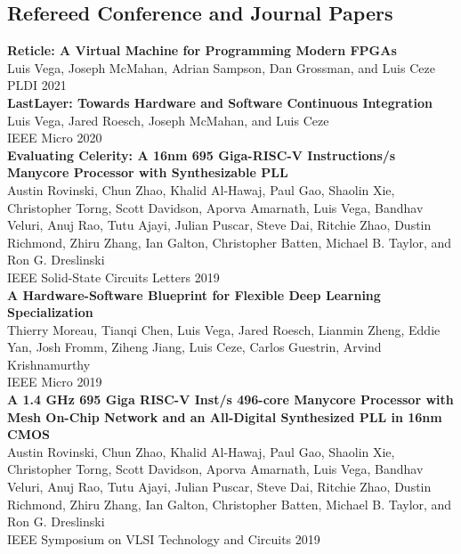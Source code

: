 \documentclass[10pt]{article}
\begin{document}
\subsection*{Refereed Conference and Journal Papers}

\textbf{%
  Reticle: A Virtual Machine for Programming Modern FPGAs
} \\
Luis Vega, Joseph McMahan, Adrian Sampson, Dan Grossman, and Luis Ceze \\
PLDI 2021 \\

\textbf{%
  LastLayer: Towards Hardware and Software Continuous Integration
} \\
Luis Vega, Jared Roesch, Joseph McMahan, and Luis Ceze \\
IEEE Micro 2020 \\

\textbf{%
  Evaluating Celerity: A 16nm 695 Giga-RISC-V Instructions/s Manycore Processor with Synthesizable PLL
} \\
Austin Rovinski, Chun Zhao, Khalid Al-Hawaj, Paul Gao, Shaolin Xie, Christopher Torng,
Scott Davidson, Aporva Amarnath, Luis Vega, Bandhav Veluri, Anuj Rao, Tutu Ajayi,
Julian Puscar, Steve Dai, Ritchie Zhao, Dustin Richmond, Zhiru Zhang, Ian Galton,
Christopher Batten, Michael B. Taylor, and Ron G. Dreslinski \\
IEEE Solid-State Circuits Letters 2019 \\

\textbf{%
  A Hardware-Software Blueprint for Flexible Deep Learning Specialization
} \\
Thierry Moreau, Tianqi Chen, Luis Vega, Jared Roesch, Lianmin Zheng, Eddie Yan,
Josh Fromm, Ziheng Jiang, Luis Ceze, Carlos Guestrin, Arvind Krishnamurthy \\
IEEE Micro 2019 \\
  
\textbf{%
  A 1.4 GHz 695 Giga RISC-V Inst/s 496-core Manycore Processor with Mesh On-Chip Network and an All-Digital Synthesized PLL in 16nm CMOS
} \\
Austin Rovinski, Chun Zhao, Khalid Al-Hawaj, Paul Gao, Shaolin Xie, Christopher Torng,
Scott Davidson, Aporva Amarnath, Luis Vega, Bandhav Veluri, Anuj Rao, Tutu Ajayi,
Julian Puscar, Steve Dai, Ritchie Zhao, Dustin Richmond, Zhiru Zhang, Ian Galton,
Christopher Batten, Michael B. Taylor, and Ron G. Dreslinski \\
IEEE Symposium on VLSI Technology and Circuits 2019 \\
  
\end{document}
